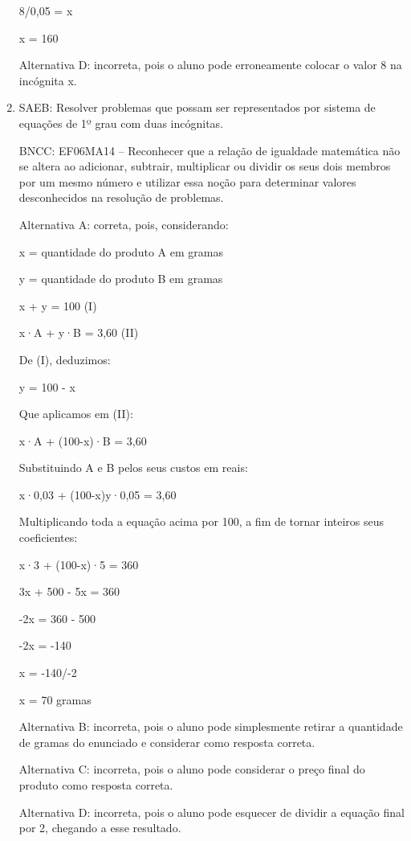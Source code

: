 \begin{enumerate}
8/0,05 = x

x = 160

Alternativa D: incorreta, pois o aluno pode erroneamente colocar o valor
8 na incógnita x.

		\item SAEB: Resolver problemas que possam ser representados por sistema de
equações de 1º grau com duas incógnitas.

BNCC: EF06MA14 -- Reconhecer que a relação de igualdade matemática não
se altera ao adicionar, subtrair, multiplicar ou dividir os seus dois
membros por um mesmo número e utilizar essa noção para determinar
valores desconhecidos na resolução de problemas.

Alternativa A: correta, pois, considerando:

x = quantidade do produto A em gramas

y = quantidade do produto B em gramas

x + y = 100 (I)

x·A + y·B = 3,60 (II)

De (I), deduzimos:

y = 100 - x

Que aplicamos em (II):

x·A + (100-x)·B = 3,60

Substituindo A e B pelos seus custos em reais:

x·0,03 + (100-x)y·0,05 = 3,60

Multiplicando toda a equação acima por 100, a fim de tornar inteiros
seus coeficientes:

x·3 + (100-x)·5 = 360

3x + 500 - 5x = 360

-2x = 360 - 500

-2x = -140

x = -140/-2

x = 70 gramas

Alternativa B: incorreta, pois o aluno pode simplesmente retirar a
quantidade de gramas do enunciado e considerar como resposta correta.

Alternativa C: incorreta, pois o aluno pode considerar o preço final do
produto como resposta correta.

Alternativa D: incorreta, pois o aluno pode esquecer de dividir a
equação final por 2, chegando a esse resultado.

	\end{enumerate}


